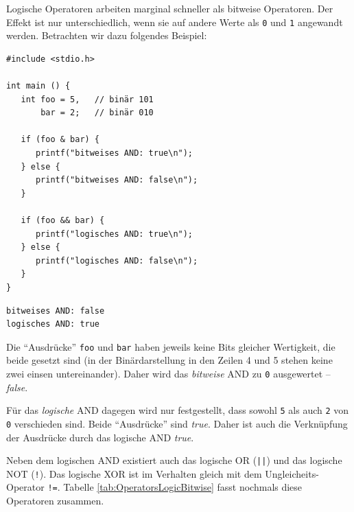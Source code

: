 Logische Operatoren arbeiten marginal schneller als bitweise Operatoren. Der Effekt ist nur unterschiedlich, wenn sie auf andere Werte als \texttt{0} und \texttt{1} angewandt werden. Betrachten wir dazu folgendes Beispiel:

\begin{codebox}
\begin{verbatim}
#include <stdio.h>

int main () {
   int foo = 5,   // binär 101
       bar = 2;   // binär 010

   if (foo & bar) {
      printf("bitweises AND: true\n");
   } else {
      printf("bitweises AND: false\n");
   }

   if (foo && bar) {
      printf("logisches AND: true\n");
   } else {
      printf("logisches AND: false\n");
   }
}
\end{verbatim}
\end{codebox}

\begin{cmdbox}
\begin{verbatim}
bitweises AND: false
logisches AND: true
\end{verbatim}
\end{cmdbox}

Die \enquote{Ausdrücke} \texttt{foo} und \texttt{bar} haben jeweils keine Bits gleicher Wertigkeit, die beide gesetzt sind (in der Binärdarstellung in den Zeilen 4 und 5 stehen keine zwei einsen untereinander). Daher wird das \emph{bitweise} AND zu \texttt{0} ausgewertet -- \emph{false}.

Für das \emph{logische} AND dagegen wird nur festgestellt, dass sowohl \texttt{5} als auch \texttt{2} von \texttt{0} verschieden sind. Beide \enquote{Ausdrücke} sind \emph{true}. Daher ist auch die Verknüpfung der Ausdrücke durch das logische AND \emph{true}.

Neben dem logischen AND existiert auch das logische OR (\texttt{||}) und das logische NOT (\texttt{!}). Das logische XOR ist im Verhalten gleich mit dem Ungleicheits-Operator \texttt{!=}. Tabelle \ref{tab:OperatorsLogicBitwise} fasst nochmals diese Operatoren zusammen.

